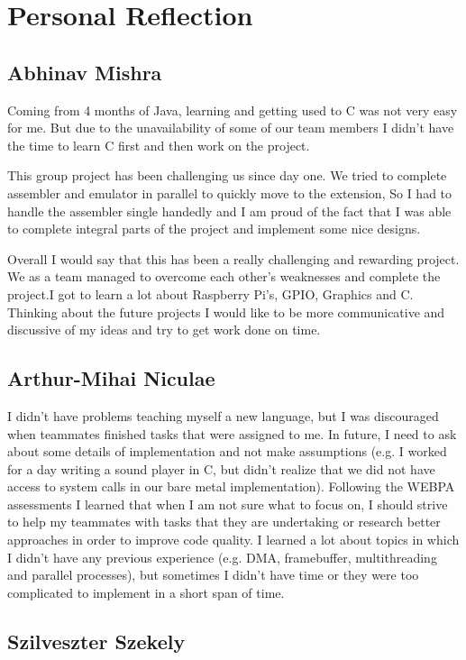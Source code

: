 \documentclass[11pt]{article}
\begin{document}
\section{Personal Reflection}

\subsection{Abhinav Mishra}

Coming from 4 months of Java, learning and getting used to C was not very easy
for me. But due to the unavailability of some of our team members I didn't have
the time to learn C first and then work on the project.

This group project has been challenging us since day one. We tried to complete
assembler and emulator in parallel to quickly move to the extension, So I had
to handle the assembler single handedly and I am proud of the fact that I was
able to complete integral parts of the project and implement some nice designs.

Overall I would say that this has been a really challenging and rewarding
project. We as a team managed to overcome each other's weaknesses and complete
the project.I got to learn a lot about Raspberry Pi's, GPIO, Graphics and C.
Thinking about the future projects I would like to be more communicative and
discussive of my ideas and try to get work done on time.

\subsection{Arthur-Mihai Niculae}

I didn’t have problems teaching myself a new language, but I was discouraged
when teammates finished tasks that were assigned to me. In future, I need to
ask about some details of implementation and not make assumptions (e.g.
I worked for a day writing a sound player in C, but didn’t realize that we did
not have access to system calls in our bare metal implementation). Following
the WEBPA assessments I learned that when I am not sure what to focus on,
I should strive to help my teammates with tasks that they are undertaking or
research better approaches in order to improve code quality. I learned a lot
about topics in which I didn’t have any previous experience (e.g. DMA,
framebuffer, multithreading and parallel processes), but sometimes I didn’t
have time or they were too complicated to implement in a short span of time.

\subsection{Szilveszter Szekely}
\end{document}
